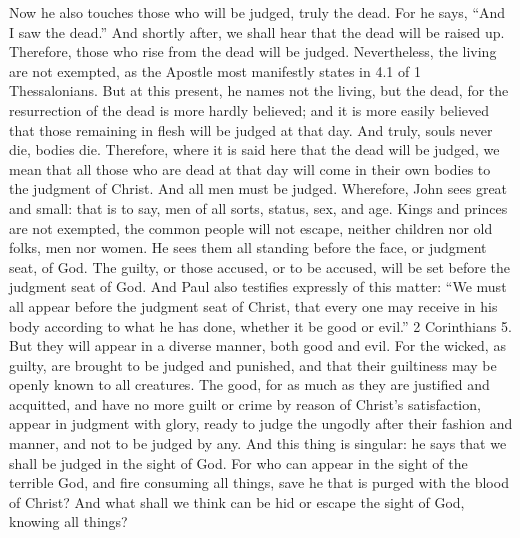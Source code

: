 Now he also touches those who will be judged, truly the dead. For he says, “And I saw the dead.” And shortly after, we shall hear that the dead will be raised up. Therefore, those who rise from the dead will be judged. Nevertheless, the living are not exempted, as the Apostle most manifestly states in 4.1 of 1 Thessalonians. But at this present, he names not the living, but the dead, for the resurrection of the dead is more hardly believed; and it is more easily believed that those remaining in flesh will be judged at that day. And truly, souls never die, bodies die. Therefore, where it is said here that the dead will be judged, we mean that all those who are dead at that day will come in their own bodies to the judgment of Christ. And all men must be judged. Wherefore, John sees great and small: that is to say, men of all sorts, status, sex, and age. Kings and princes are not exempted, the common people will not escape, neither children nor old folks, men nor women. He sees them all standing before the face, or judgment seat, of God. The guilty, or those accused, or to be accused, will be set before the judgment seat of God. And Paul also testifies expressly of this matter: “We must all appear before the judgment seat of Christ, that every one may receive in his body according to what he has done, whether it be good or evil.” 2 Corinthians 5. But they will appear in a diverse manner, both good and evil. For the wicked, as guilty, are brought to be judged and punished, and that their guiltiness may be openly known to all creatures. The good, for as much as they are justified and acquitted, and have no more guilt or crime by reason of Christ’s satisfaction, appear in judgment with glory, ready to judge the ungodly after their fashion and manner, and not to be judged by any. And this thing is singular: he says that we shall be judged in the sight of God. For who can appear in the sight of the terrible God, and fire consuming all things, save he that is purged with the blood of Christ? And what shall we think can be hid or escape the sight of God, knowing all things?

